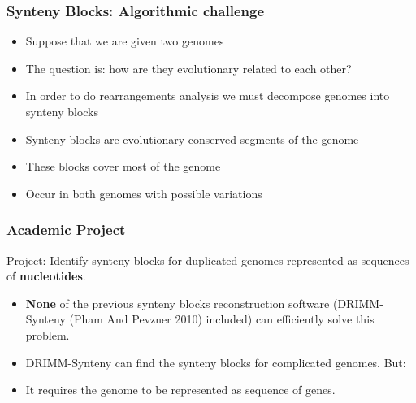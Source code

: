 \documentclass[svgnames,14pt]{beamer}
\begin{document}
\begin{frame}
\frametitle{Synteny Blocks: Algorithmic challenge}
\begin{itemize}
\item Suppose that we are given two genomes
\item The question is: how are they evolutionary related to each other?
\item In order to do rearrangements analysis we must decompose genomes into synteny blocks
\item Synteny blocks are evolutionary conserved segments of the genome
\item These blocks cover most of the genome
\item Occur in both genomes with possible variations
\end{itemize}
\end{frame}

\begin{frame}
\frametitle{Academic Project}

Project: Identify synteny blocks for duplicated genomes represented as sequences of \textbf{nucleotides}.

\begin{itemize}
\item \textbf{None} of the previous synteny blocks reconstruction software (DRIMM-Synteny (Pham And Pevzner 2010) included) can 
efficiently solve this problem. 
\item DRIMM-Synteny can find the synteny blocks for complicated genomes. But:
\pause \item It requires the genome to be represented as sequence of genes. 
\end{itemize}
\end{frame}

\end{document}
